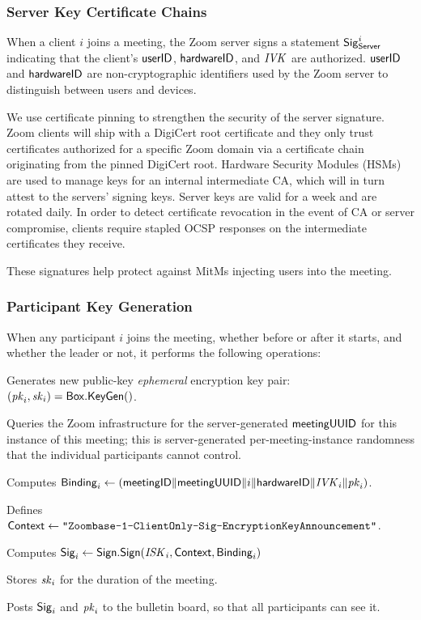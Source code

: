 \subsubsection{Server Key Certificate Chains}
\label{subsubsec:servercert}

When a client $i$ joins a meeting, the Zoom server signs a statement ${\sf Sig}^i_{\mathsf{Server}}$
indicating that the client's $\mathsf{userID}$, ${\sf hardwareID}$, and $\mathit{IVK}$ are authorized. $\mathsf{userID}$ and
${\sf hardwareID}$ are non-cryptographic identifiers used by the Zoom server to distinguish between users
and devices.

We use certificate pinning to strengthen the security of the server signature. Zoom clients will
ship with a DigiCert root certificate and they only trust certificates authorized for a
specific Zoom domain via a certificate chain originating from the pinned DigiCert root. Hardware Security
Modules (HSMs) are used to manage keys for an internal intermediate CA, which will in turn attest to
the servers' signing keys. Server keys are valid for a week and are rotated daily. In order to
detect certificate revocation in the event of CA or server compromise, clients require stapled OCSP
responses on the intermediate certificates they receive.

These signatures help protect against MitMs injecting users into the meeting.

\subsubsection{Participant Key Generation}
\label{subsubsec:partikeygen}
When any participant $i$ joins the meeting, whether before or after it starts, and whether the
leader or not, it performs the following operations:

\begingroup
\RaggedRight
\begin{enumerate*}
\item Generates new public-key \textit{ephemeral} encryption key pair: $(\mathit{pk}_i, \mathit{sk}_i) =
{\sf Box}.\mathsf{KeyGen}()$.
\item Queries the Zoom infrastructure for the server-generated ${\sf meetingUUID}$ for this instance of
this meeting; this is server-generated per-meeting-instance randomness that the individual
participants cannot control.
\item Computes ${\sf Binding}_i \leftarrow \left( {\sf meetingID} \| \allowbreak {\sf meetingUUID} \| i \allowbreak
\| {\sf hardwareID} \| \mathit{IVK}_i \| \allowbreak \mathit{pk}_i \right)$.
\item Defines ${\sf Context} \leftarrow \texttt{"Zoombase-1-ClientOnly-Sig-EncryptionKeyAnnouncement"}$.
\item Computes ${\sf Sig}_i \leftarrow {\sf Sign}.\mathsf{Sign}(\mathit{ISK}_i, {\sf Context}, {\sf Binding}_i)$
\item Stores $\mathit{sk}_i$ for the duration of the meeting.
\item Posts ${\sf Sig}_i$ and $\mathit{pk}_i$ to the bulletin board, so that all participants can see it.
\end{enumerate*}
\endgroup

